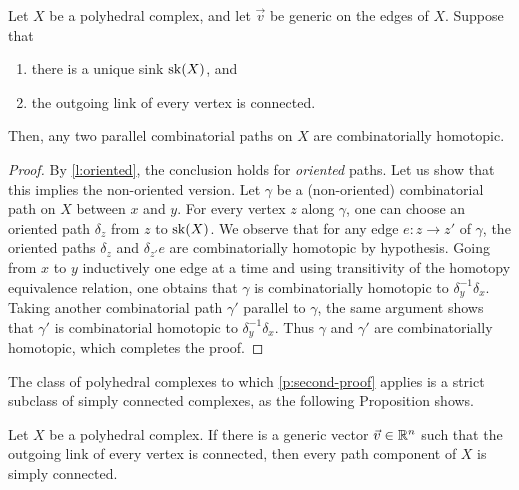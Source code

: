 \begin{thm}
\label{p:second-proof}
    Let $X$ be a polyhedral complex, and let $\vec v$ be generic on the edges of $X$.
    Suppose that 
    \begin{enumerate}[label=\roman*)]
        \item there is a unique sink $\mathrm{sk}(X)$, and
        \item the outgoing link of every vertex is  connected.
    \end{enumerate}
    Then, any two parallel combinatorial paths on $X$ are combinatorially homotopic.
\end{thm}

\begin{proof} 
    By \cref{l:oriented}, the conclusion holds for \emph{oriented} paths.  
    Let us show that this implies the non-oriented version.
    Let $\gamma$ be a (non-oriented) combinatorial path on $X$ between $x$ and $y$.
    For every vertex $z$ along $\gamma$, one can choose an oriented path $\delta_z$ from $z$ to $\mathrm{sk}(X)$. 
    We observe that for any edge $e: z \to z'$ of $\gamma$, the oriented paths $\delta_z$ and $\delta_{z'}e$ are combinatorially homotopic by hypothesis. 
    Going from $x$ to $y$ inductively one edge at a time and using transitivity of the homotopy equivalence relation, one obtains that $\gamma$ is combinatorially homotopic to $\delta_y^{-1}\delta_x$. 
    Taking another combinatorial path $\gamma'$ parallel to $\gamma$, the same argument shows that $\gamma'$ is combinatorial homotopic to $\delta_y^{-1}\delta_x$.
    Thus $\gamma$ and $\gamma'$ are combinatorially homotopic, which completes the proof. 
\end{proof}

The class of polyhedral complexes to which \cref{p:second-proof} applies is a strict subclass of simply connected complexes, as the following Proposition shows.

\begin{proposition}
    \label{lemma:outgoing-link}
    Let $X$ be a polyhedral complex.
    If there is a generic vector $\vec v \in \mathbb R^n$ such that the outgoing link of every vertex is connected, then every path component of $X$ is simply connected.
\end{proposition}

